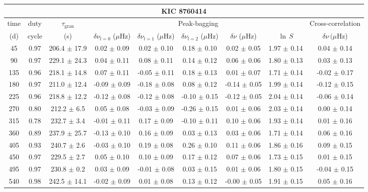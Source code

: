 \documentclass[twocolumn]{aastex61}%
\begin{document}
\begin{table*}[ht]\centering\fontsize{9.}{7.}\selectfont
\begin{tabular}{ccc|ccccc|c}
\multicolumn{9}{c}{KIC 8760414}\\ \hline\hline
time & duty & $\tau_\text{gran}$ &\multicolumn{5}{c|}{Peak-bagging}&Cross-correlation\\
(d)& cycle & (s)&$\delta\nu_{l=0}$ ($\mu$Hz) & $\delta\nu_{l=1}$ ($\mu$Hz) & $\delta\nu_{l=2}$ ($\mu$Hz) & $\delta\nu$ ($\mu$Hz)& $\ln\,S$ & $\delta\nu\,(\mu$Hz)\\\hline
45 & 0.97 & 206.4 $\pm$ 17.9 & 0.02 $\pm$ 0.09 & 0.02 $\pm$ 0.10 & 0.18 $\pm$ 0.10 & 0.02 $\pm$ 0.05 & 1.97 $\pm$ 0.14 & 0.04 $\pm$ 0.14\\
90 & 0.97 & 229.1 $\pm$ 24.3 & 0.04 $\pm$ 0.11 & 0.08 $\pm$ 0.11 & 0.14 $\pm$ 0.12 & 0.06 $\pm$ 0.06 & 1.80 $\pm$ 0.13 & 0.03 $\pm$ 0.13\\
135 & 0.96 & 218.1 $\pm$ 14.8 & 0.07 $\pm$ 0.11 & -0.05 $\pm$ 0.11 & 0.18 $\pm$ 0.13 & 0.01 $\pm$ 0.07 & 1.71 $\pm$ 0.14 & -0.02 $\pm$ 0.17\\
180 & 0.97 & 211.0 $\pm$ 12.4 & -0.09 $\pm$ 0.09 & -0.18 $\pm$ 0.08 & 0.08 $\pm$ 0.12 & -0.14 $\pm$ 0.05 & 1.99 $\pm$ 0.14 & -0.12 $\pm$ 0.15\\
225 & 0.96 & 218.8 $\pm$ 12.2 & -0.12 $\pm$ 0.08 & -0.12 $\pm$ 0.08 & -0.10 $\pm$ 0.15 & -0.12 $\pm$ 0.05 & 2.04 $\pm$ 0.14 & -0.06 $\pm$ 0.14\\
270 & 0.80 & 212.2 $\pm$ 6.5 & 0.05 $\pm$ 0.08 & -0.03 $\pm$ 0.09 & -0.26 $\pm$ 0.15 & 0.01 $\pm$ 0.06 & 2.03 $\pm$ 0.14 & 0.00 $\pm$ 0.14\\
315 & 0.78 & 232.7 $\pm$ 3.4 & -0.01 $\pm$ 0.11 & 0.17 $\pm$ 0.09 & -0.10 $\pm$ 0.11 & 0.10 $\pm$ 0.06 & 1.93 $\pm$ 0.14 & 0.01 $\pm$ 0.16\\
360 & 0.89 & 237.9 $\pm$ 25.7 & -0.13 $\pm$ 0.10 & 0.16 $\pm$ 0.09 & 0.03 $\pm$ 0.13 & 0.03 $\pm$ 0.06 & 1.71 $\pm$ 0.14 & 0.06 $\pm$ 0.16\\
405 & 0.93 & 240.7 $\pm$ 2.6 & -0.03 $\pm$ 0.10 & 0.19 $\pm$ 0.08 & 0.26 $\pm$ 0.10 & 0.11 $\pm$ 0.06 & 1.86 $\pm$ 0.16 & 0.09 $\pm$ 0.15\\
450 & 0.97 & 229.5 $\pm$ 2.7 & 0.05 $\pm$ 0.10 & 0.10 $\pm$ 0.09 & 0.17 $\pm$ 0.12 & 0.07 $\pm$ 0.06 & 1.73 $\pm$ 0.15 & 0.01 $\pm$ 0.15\\
495 & 0.97 & 230.8 $\pm$ 0.2 & 0.03 $\pm$ 0.09 & -0.01 $\pm$ 0.08 & 0.03 $\pm$ 0.15 & 0.01 $\pm$ 0.06 & 1.80 $\pm$ 0.15 & -0.04 $\pm$ 0.15\\
540 & 0.98 & 242.5 $\pm$ 14.1 & -0.02 $\pm$ 0.09 & 0.01 $\pm$ 0.08 & 0.13 $\pm$ 0.12 & -0.00 $\pm$ 0.05 & 1.91 $\pm$ 0.15 & 0.05 $\pm$ 0.16\\

\end{tabular}
\end{table*}
\end{document}
